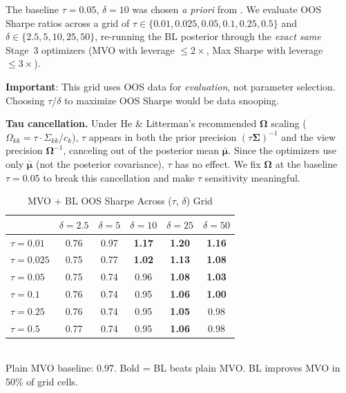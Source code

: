 \documentclass[12pt,a4paper]{article}
\begin{document}
The baseline $\tau = 0.05$, $\delta = 10$ was chosen \textit{a priori} from \citet{he1999intuition}. We evaluate OOS Sharpe ratios across a grid of $\tau \in \{0.01, 0.025, 0.05, 0.1, 0.25, 0.5\}$ and $\delta \in \{2.5, 5, 10, 25, 50\}$, re-running the BL posterior through the \textit{exact same} Stage~3 optimizers (MVO with leverage $\leq 2\times$, Max Sharpe with leverage $\leq 3\times$).

\textbf{Important}: This grid uses OOS data for \textit{evaluation}, not parameter selection. Choosing $\tau$/$\delta$ to maximize OOS Sharpe would be data snooping.

\textbf{Tau cancellation.} Under He \& Litterman's recommended $\boldsymbol{\Omega}$ scaling ($\Omega_{kk} = \tau \cdot \Sigma_{kk} / c_k$), $\tau$ appears in both the prior precision $(\tau\boldsymbol{\Sigma})^{-1}$ and the view precision $\boldsymbol{\Omega}^{-1}$, canceling out of the posterior mean $\bar{\boldsymbol{\mu}}$. Since the optimizers use only $\bar{\boldsymbol{\mu}}$ (not the posterior covariance), $\tau$ has no effect. We fix $\boldsymbol{\Omega}$ at the baseline $\tau = 0.05$ to break this cancellation and make $\tau$ sensitivity meaningful.

\begin{table}[H]
\centering
\caption{MVO + BL OOS Sharpe Across ($\tau$, $\delta$) Grid}
\label{tab:bl_grid_mvo}
\small
\begin{tabular}{lccccc}
\toprule
 & $\delta=2.5$ & $\delta=5$ & $\delta=10$ & $\delta=25$ & $\delta=50$ \\
\midrule
$\tau=0.01$  & 0.76 & 0.97 & \textbf{1.17} & \textbf{1.20} & \textbf{1.16} \\
$\tau=0.025$ & 0.75 & 0.77 & \textbf{1.02} & \textbf{1.13} & \textbf{1.08} \\
$\tau=0.05$  & 0.75 & 0.74 & 0.96 & \textbf{1.08} & \textbf{1.03} \\
$\tau=0.1$   & 0.76 & 0.74 & 0.95 & \textbf{1.06} & \textbf{1.00} \\
$\tau=0.25$  & 0.76 & 0.74 & 0.95 & \textbf{1.05} & 0.98 \\
$\tau=0.5$   & 0.77 & 0.74 & 0.95 & \textbf{1.06} & 0.98 \\
\bottomrule
\end{tabular}
\\[0.3em]
\small Plain MVO baseline: 0.97. Bold = BL beats plain MVO. BL improves MVO in 50\% of grid cells.
\end{table}
\end{document}
